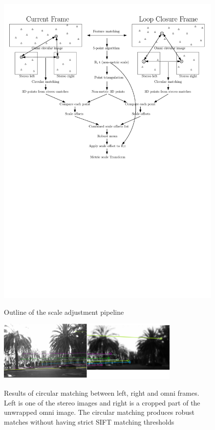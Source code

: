 \begin{figure}[H]
  \centering
    \includegraphics[width=1.0\textwidth]{chapters/images/6_images_scale_adjust}\\
  \caption{Outline of the scale adjustment pipeline}
  \label{fig:scale_adjust_flowchart}
\end{figure}

\begin{figure}[H]
  \centering
    \includegraphics[width=0.8\textwidth]{chapters/images/circular_match}\\
  \caption{Results of circular matching between left, right and omni frames. Left is one of the stereo images and right is a cropped part of the unwrapped omni image. The circular matching produces robust matches without having strict SIFT matching thresholds}
  \label{fig:circular_match}
\end{figure}


